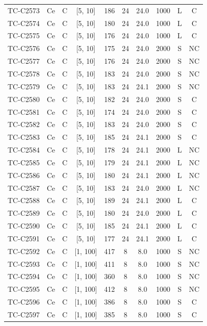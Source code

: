 \begin{longtable}{lccccccccc}
TC-C2573 & Ce & C & [5, 10] & 186 & 24 & 24.0 & 1000 & L & C \\
TC-C2574 & Ce & C & [5, 10] & 180 & 24 & 24.0 & 1000 & L & C \\
TC-C2575 & Ce & C & [5, 10] & 176 & 24 & 24.0 & 1000 & L & C \\
TC-C2576 & Ce & C & [5, 10] & 175 & 24 & 24.0 & 2000 & S & NC \\
TC-C2577 & Ce & C & [5, 10] & 176 & 24 & 24.0 & 2000 & S & NC \\
TC-C2578 & Ce & C & [5, 10] & 183 & 24 & 24.0 & 2000 & S & NC \\
TC-C2579 & Ce & C & [5, 10] & 183 & 24 & 24.1 & 2000 & S & NC \\
TC-C2580 & Ce & C & [5, 10] & 182 & 24 & 24.0 & 2000 & S & C \\
TC-C2581 & Ce & C & [5, 10] & 174 & 24 & 24.0 & 2000 & S & C \\
TC-C2582 & Ce & C & [5, 10] & 183 & 24 & 24.0 & 2000 & S & C \\
TC-C2583 & Ce & C & [5, 10] & 185 & 24 & 24.1 & 2000 & S & C \\
TC-C2584 & Ce & C & [5, 10] & 178 & 24 & 24.1 & 2000 & L & NC \\
TC-C2585 & Ce & C & [5, 10] & 179 & 24 & 24.1 & 2000 & L & NC \\
TC-C2586 & Ce & C & [5, 10] & 180 & 24 & 24.1 & 2000 & L & NC \\
TC-C2587 & Ce & C & [5, 10] & 183 & 24 & 24.0 & 2000 & L & NC \\
TC-C2588 & Ce & C & [5, 10] & 189 & 24 & 24.1 & 2000 & L & C \\
TC-C2589 & Ce & C & [5, 10] & 180 & 24 & 24.0 & 2000 & L & C \\
TC-C2590 & Ce & C & [5, 10] & 185 & 24 & 24.1 & 2000 & L & C \\
TC-C2591 & Ce & C & [5, 10] & 177 & 24 & 24.1 & 2000 & L & C \\
TC-C2592 & Ce & C & [1, 100] & 417 & 8 & 8.0 & 1000 & S & NC \\
TC-C2593 & Ce & C & [1, 100] & 411 & 8 & 8.0 & 1000 & S & NC \\
TC-C2594 & Ce & C & [1, 100] & 360 & 8 & 8.0 & 1000 & S & NC \\
TC-C2595 & Ce & C & [1, 100] & 412 & 8 & 8.0 & 1000 & S & NC \\
TC-C2596 & Ce & C & [1, 100] & 386 & 8 & 8.0 & 1000 & S & C \\
TC-C2597 & Ce & C & [1, 100] & 385 & 8 & 8.0 & 1000 & S & C \\

\end{longtable}

